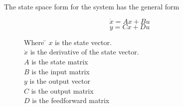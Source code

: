 The state space form for the system has the general form 
\begin{figure}[h]

\begin{equation}
\dot{x}=Ax+Bu
\end{equation}
\begin{equation}
y=Cx+Du
\end{equation}
\begin{tabbing}
Where \= $x$ is the state vector.\\
	\> $\dot{x}$ is the derivative of the state vector.\\
	\> $A$ is the state matrix\\
	\> $B$ is the input matrix\\
	\> $y$ is the output vector\\
	\> $C$ is the output matrix\\
	\> $D$ is the feedforward matrix
	
	
\end{tabbing}
\end{figure}
